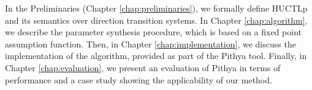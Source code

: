 In the Preliminaries (Chapter \ref{chap:preliminaries}), we formally define \ac{HUCTLp} and its semantics over direction transition systems. In Chapter \ref{chap:algorithm}, we describe the parameter synthesis procedure, which is based on a fixed point assumption function. Then, in Chapter \ref{chap:implementation}, we discuss the implementation of the algorithm, provided as part of the Pithya tool. Finally, in Chapter \ref{chap:evaluation}, we present an evaluation of Pithya in terms of performance and a case study showing the applicability of our method. 

